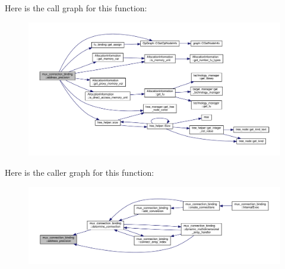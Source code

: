 Here is the call graph for this function\+:
\nopagebreak
\begin{figure}[H]
\begin{center}
\leavevmode
\includegraphics[width=350pt]{d7/d1e/classmux__connection__binding_ac5426fb29f88f4e8a2b1a3dc3cb7be9a_cgraph}
\end{center}
\end{figure}
Here is the caller graph for this function\+:
\nopagebreak
\begin{figure}[H]
\begin{center}
\leavevmode
\includegraphics[width=350pt]{d7/d1e/classmux__connection__binding_ac5426fb29f88f4e8a2b1a3dc3cb7be9a_icgraph}
\end{center}
\end{figure}
\mbox{\label{classmux__connection__binding_ad251a8347349b835c134d933a8f02048}} 
